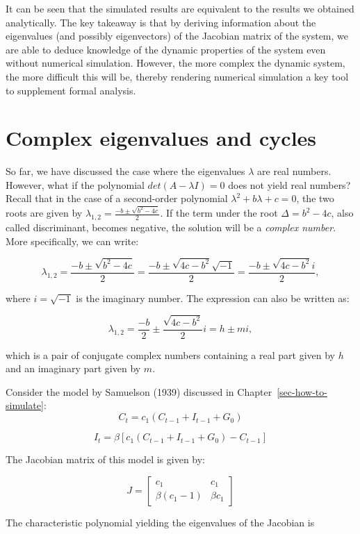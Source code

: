 \documentclass[
  letterpaper,
  DIV=11,
  numbers=noendperiod]{scrreprt}
\begin{document}
It can be seen that the simulated results are equivalent to the results
we obtained analytically. The key takeaway is that by deriving
information about the eigenvalues (and possibly eigenvectors) of the
Jacobian matrix of the system, we are able to deduce knowledge of the
dynamic properties of the system even without numerical simulation.
However, the more complex the dynamic system, the more difficult this
will be, thereby rendering numerical simulation a key tool to supplement
formal analysis.

\section{Complex eigenvalues and
cycles}\label{complex-eigenvalues-and-cycles}

So far, we have discussed the case where the eigenvalues \(\lambda\) are
real numbers. However, what if the polynomial \(det(A-\lambda I)=0\)
does not yield real numbers? Recall that in the case of a second-order
polynomial \(\lambda^2+b\lambda+c=0\), the two roots are given by
\(\lambda_{1,2} = \frac{-b \pm \sqrt{b^2-4c}}{2}\). If the term under
the root \(\Delta=b^2-4c\), also called discriminant, becomes negative,
the solution will be a \emph{complex number}. More specifically, we can
write:

\[
\lambda_{1,2} = \frac{-b \pm \sqrt{b^2-4c}}{2}=\frac{-b \pm \sqrt{4c-b^2}\sqrt{-1}}{2} =\frac{-b \pm \sqrt{4c-b^2}i}{2}, 
\]

where \(i=\sqrt{-1}\) is the imaginary number. The expression can also
be written as:

\[
\lambda_{1,2} = \frac{-b}{2} \pm \frac{\sqrt{4c-b^2}}{2}i = h \pm mi,
\]

which is a pair of conjugate complex numbers containing a real part
given by \(h\) and an imaginary part given by \(m\).

Consider the model by Samuelson (1939) discussed in
Chapter~\ref{sec-how-to-simulate}: \[
C_t= c_1(C_{t-1} + I_{t-1} + G_0)
\]

\[
I_t= \beta[c_1(C_{t-1} + I_{t-1} + G_0) - C_{t-1}]
\]

The Jacobian matrix of this model is given by:

\[
J=\begin{bmatrix} c_1 & c_1 \\ \beta(c_1-1) & \beta c_1 \end{bmatrix}
\]

The characteristic polynomial yielding the eigenvalues of the Jacobian
is
\end{document}
